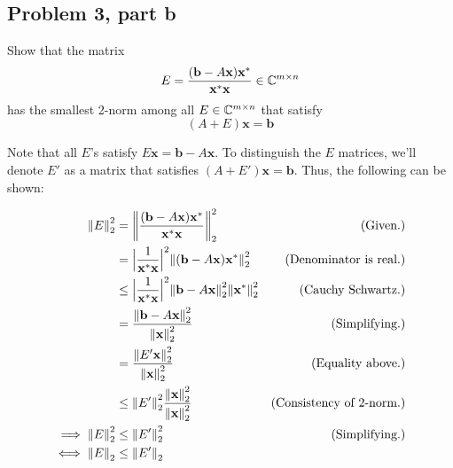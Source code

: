 \newpage
\subsection{Problem 3, part b}
Show that the matrix 
\[
E = \frac{(\textbf{b} - A\textbf{x})\textbf{x}^*}{\textbf{x}^*\textbf{x}} \in \mathbb{C}^{m\times n}
\]
has the smallest 2-norm among all $E \in \mathbb{C}^{m\times n}$ that satisfy 
\[
(A + E) \textbf{x} = \textbf{b}
\]
\partbreak
\begin{solution}

 Note that all $E$'s satisfy $E\textbf{x} = \textbf{b} - A\textbf{x}$. To distinguish the $E$ matrices, we'll denote $E'$ as a matrix that satisfies $(A+E')\textbf{x} = \textbf{b}$. Thus, the following can be shown:

 \alignbreak
 \begin{align}
     \norm{E}_2^2 &= \norm{\frac{(\textbf{b} - A\textbf{x})\textbf{x}^*}{\textbf{x}^*\textbf{x}}}^2_2 &\text{(Given.)}\nonumber\\
     &= \Big| \frac{1}{\textbf{x}^*\textbf{x}}\Big|^2 \norm{(\textbf{b} - A\textbf{x})\textbf{x}^*}_2^2 &\text{(Denominator is real.)}\nonumber\\
     &\leq \Big| \frac{1}{\textbf{x}^*\textbf{x}}\Big|^2 \norm{\textbf{b} - A\textbf{x}}_2^2\norm{\textbf{x}^*}_2^2 &\text{(Cauchy Schwartz.)}\nonumber\\
     &= \frac{\norm{\textbf{b} - A\textbf{x}}_2^2}{\norm{\textbf{x}}^2_2} &\text{(Simplifying.)}\nonumber\\
     &= \frac{\norm{E'\textbf{x}}_2^2}{\norm{\textbf{x}}_2^2} &\text{(Equality above.)}\nonumber\\
     &\leq \norm{E'}_2^2 \frac{\norm{\textbf{x}}_2^2}{\norm{\textbf{x}}_2^2} &\text{(Consistency of 2-norm.)}\nonumber\\
     \implies \norm{E}_2^2&\leq \norm{E'}_2^2 &\text{(Simplifying.)}\nonumber\\
     \iff \norm{E}_2 &\leq \norm{E'}_2 \nonumber
 \end{align}
 \alignbreak
\end{solution}

\newpage
